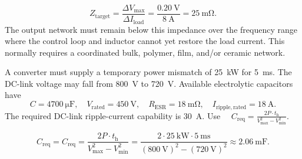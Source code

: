 
\begin{solutionblock}
    \begin{equation}
        Z_\mathrm{target}=\frac{\Delta V_\mathrm{max}}{\Delta I_\mathrm{load}}=\frac{\SI{0.20}{\volt}}{\SI{8}{\ampere}}
        =\SI{25}{\milli\ohm}.
    \end{equation}
    The output network must remain below this impedance over the frequency range
    where the control loop and inductor cannot yet restore the load current.
    This normally requires a coordinated bulk, polymer, film, and/or ceramic network.
\end{solutionblock}




A converter must supply a temporary power mismatch of \SI{25}{\kilo\watt} for
\SI{5}{\milli\second}. The DC-link voltage may fall from \SI{800}{\volt} to
\SI{720}{\volt}. Available electrolytic capacitors have
\begin{equation*}
    C=\SI{4700}{\micro\farad},\quad
    V_\mathrm{rated}=\SI{450}{\volt},\quad
    R_\mathrm{ESR}=\SI{18}{\milli\ohm},\quad
    I_\mathrm{ripple,rated}=\SI{18}{\ampere}.
\end{equation*}
The required DC-link ripple-current capability is \SI{30}{\ampere}. Use
$\quad C_\mathrm{req}=\frac{2P \cdot t_\mathrm{h}}{V_\mathrm{max}^2-V_\mathrm{min}^2}.$



\begin{solutionblock}
    \begin{equation}
        C_\mathrm{req} = C_\mathrm{req}=\frac{2P \cdot t_\mathrm{h}}{V_\mathrm{max}^2-V_\mathrm{min}^2}
        =\frac{2\cdot\SI{25}{\kilo\watt}\cdot\SI{5}{\milli\second}}
        {(\SI{800}{\volt})^2-(\SI{720}{\volt})^2}
        \approx\SI{2.06}{\milli\farad}.
    \end{equation}
\end{solutionblock}


